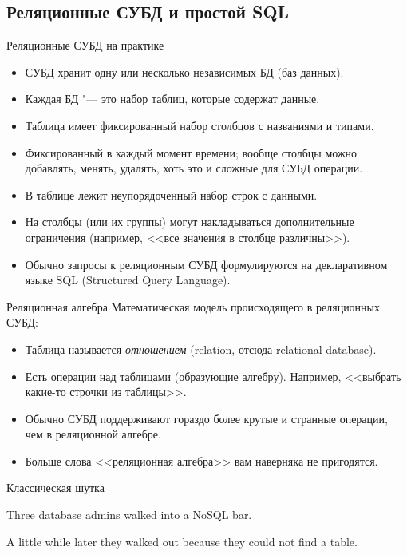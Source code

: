 \subsection{Реляционные СУБД и простой SQL}

\begin{frame}{Реляционные СУБД на практике}
	\begin{itemize}
		\item СУБД хранит одну или несколько независимых БД (баз данных).
		\item Каждая БД "--- это набор таблиц, которые содержат данные.
		\item Таблица имеет фиксированный набор столбцов с названиями и типами.
		\item Фиксированный в каждый момент времени; вообще столбцы можно добавлять, менять, удалять, хоть это и сложные для СУБД операции.
		\item В таблице лежит неупорядоченный набор строк с данными.
		\item На столбцы (или их группы) могут накладываться дополнительные ограничения (например, <<все значения в столбце различны>>).
		\item Обычно запросы к реляционным СУБД формулируются на декларативном языке SQL
			(Structured Query Language).
	\end{itemize}
\end{frame}

\begin{frame}{Реляционная алгебра}
	Математическая модель происходящего в реляционных СУБД:
	\begin{itemize}
		\item Таблица называется \textit{отношением} (relation, отсюда relational database).
		\item Есть операции над таблицами (образующие алгебру).
			Например, <<выбрать какие-то строчки из таблицы>>.
		\item Обычно СУБД поддерживают гораздо более крутые и странные операции,
			чем в реляционной алгебре.
		\item Больше слова <<реляционная алгебра>> вам наверняка не пригодятся.
	\end{itemize}
\end{frame}

\begin{frame}{Классическая шутка}
	\begin{center}
		\LARGE
		Three database admins walked into a NoSQL bar.

		A little while later they walked out because they could not find a table.
	\end{center}
\end{frame}

